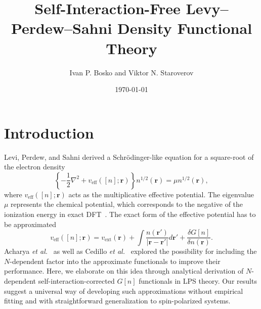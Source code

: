\documentclass[%
 reprint,
 amsmath,amssymb,
 aps,
pra,
]{revtex4-2}
\begin{document}
\title{Self-Interaction-Free Levy--Perdew--Sahni Density Functional Theory}%

\author{Ivan P. Bosko and Viktor N. Staroverov}
%

\date{\today}

\begin{abstract}

\end{abstract}
\maketitle

\section{Introduction}

Levi, Perdew, and Sahni derived a Schrödinger-like equation for a square-root of the electron density
\begin{equation}\label{eq: LPS Differential Equation}
    \left\{
    -\frac{1}{2}\nabla^2
    +
    v_{\text{eff}}([n];\textbf{r})
    \right\}
    n^{1/2}(\textbf{r})
    =
    \mu n^{1/2}(\textbf{r}),
\end{equation} 
where $v_{\text{eff}}([n];\textbf{r})$ acts as the multiplicative effective potential. The eigenvalue $\mu$ represents the chemical potential, which corresponds to the negative of the ionization energy in exact DFT~\cite{Levy.1984.PRA.30.2745}. The exact form of the effective potential has to be approximated 
\begin{equation}\label{eq: LPS Effective Potential}
    v_{\text{eff}}([n]; \textbf{r})
    =
    v_{\text{ext}}(\textbf{r})
    +
    \int\frac{n(\textbf{r}')}{|\textbf{r}-\textbf{r}'|}
    d\textbf{r}'
    +
    \frac{\delta G[n]}{\delta n(\textbf{r})}.
\end{equation}
Acharya \textit{et al.}~\cite{Acharya.1980.PNAS.77.6978} as well as Cedillo \textit{et al.}~\cite{Cedillo.1986.JCP.85.7188} explored the possibility for including the $N$-dependent factor into the approximate functionals to improve their performance. Here, we elaborate on this idea through analytical derivation of $N$-dependent self-interaction-corrected $G[n]$ functionals in LPS theory. Our results suggest a universal way of developing such approximations without empirical fitting and with straightforward generalization to spin-polarized systems.
\end{document}
